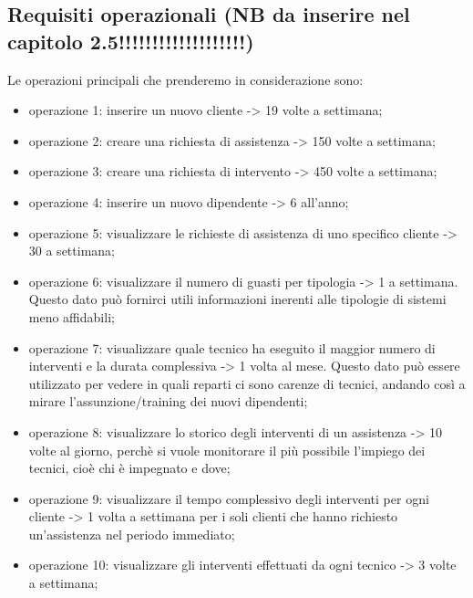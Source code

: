 \documentclass[legalpaper]{article}
\begin{document}
	\subsection{Requisiti operazionali (NB da inserire nel capitolo 2.5!!!!!!!!!!!!!!!!!!!)}
	Le operazioni principali che prenderemo in considerazione sono:
	\begin{itemize}
		\item operazione 1: inserire un nuovo cliente -> 19 volte a settimana;
		\item operazione 2: creare una richiesta di assistenza -> 150 volte a settimana;
		\item operazione 3: creare una richiesta di intervento -> 450 volte a settimana;
		\item operazione 4: inserire un nuovo dipendente -> 6 all'anno;
		\item operazione 5: visualizzare le richieste di assistenza di uno specifico cliente -> 30 a settimana;
		\item operazione 6: visualizzare il numero di guasti per tipologia -> 1 a settimana. Questo dato può fornirci utili informazioni inerenti alle tipologie di sistemi meno affidabili; 
		\item operazione 7: visualizzare quale tecnico ha eseguito il maggior numero di interventi e la durata complessiva -> 1 volta al mese. Questo dato può essere utilizzato per vedere in quali reparti ci sono carenze di tecnici, andando così a mirare l'assunzione/training dei nuovi dipendenti;
		\item operazione 8: visualizzare lo storico degli interventi di un assistenza -> 10 volte al giorno, perchè si vuole monitorare il più possibile l'impiego dei tecnici, cioè chi è impegnato e dove;
		\item operazione 9: visualizzare il tempo complessivo degli interventi per ogni cliente -> 1 volta a settimana per i soli clienti che hanno richiesto un'assistenza nel periodo immediato;
		\item operazione 10: visualizzare gli interventi effettuati da ogni tecnico -> 3 volte a settimana;
	\end{itemize}
\end{document}
